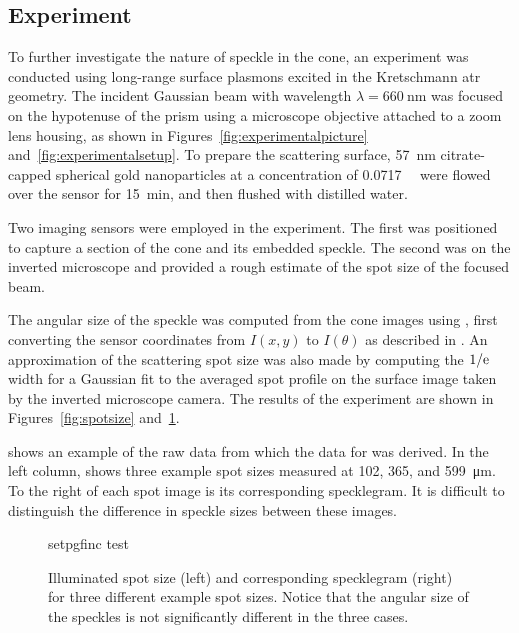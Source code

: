 \subsection{Experiment}\label{sec:specklesizeexpf}
To further investigate the nature of speckle in the cone, an experiment was
conducted using long-range surface plasmons excited in the Kretschmann \gls{atr}
geometry.  The incident Gaussian beam with wavelength $\lambda =
	\SI{660}{\nano\meter}$ was focused on the hypotenuse of the prism using a
microscope objective attached to a zoom lens housing, as shown in
Figures~\ref{fig:experimentalpicture} and~\ref{fig:experimentalsetup}.  To
prepare the scattering surface, \SI{57}{\nano\meter} citrate-capped spherical
gold nanoparticles at a concentration of \SI{0.0717}{\nano\Molar} were flowed
over the sensor for \SI{15}{\minute}, and then flushed with distilled
water.

Two imaging sensors were employed in the experiment.  The first was positioned
to capture a section of the cone and its embedded speckle.  The second was on
the inverted microscope and provided a rough estimate of the spot size of the
focused beam.

The angular size of the speckle was computed from the cone images using
, first converting the sensor coordinates from $I(x,y)$
to $I(\theta)$ as described in .  An approximation of the
scattering spot size was also made by computing the $1/{\mathrm{e}}$ width for a
Gaussian fit to the averaged spot profile on the surface image taken by the
inverted microscope camera.  The results of the experiment are shown in
Figures~\ref{fig:spotsize} and~\ref{fig:spotsizewspeckle}.

 shows an example of the raw data from which the
data for  was derived.  In the left column,
 shows three example spot sizes measured at 102,
365, and \SI{599}{\micro\meter}.  To the right of each spot image is its
corresponding specklegram.  It is difficult to distinguish the difference in
speckle sizes between these images.
\begin{figure}[ht]
	\centering
	{setpgfinc}
	{test}
	\caption{Illuminated spot size (left) and corresponding specklegram (right)
		for three different example spot sizes.  Notice that the angular size of the
		speckles is not significantly different in the three cases.}
	\label{fig:spotsizewspeckle}
\end{figure}

